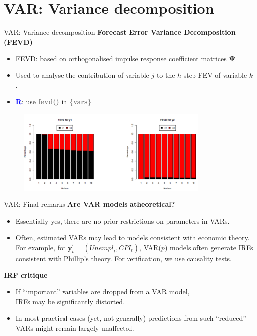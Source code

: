 \documentclass[usenames,dvipsnames]{beamer}
\begin{document}
\section{VAR: Variance decomposition}
\begin{frame}{VAR: Variance decomposition}
\textbf{Forecast Error Variance Decomposition (FEVD)}\\
\medskip
\begin{itemize}
\item FEVD: based on orthogonalised impulse response coefficient matrices $\bm{\Psi}$
\item Used to analyse the contribution of variable $j$ to the $h$-step FEV of variable $k$.
\item \textcolor{Blue}{\textbf{R}}: use \textbf{\textcolor{Gray}{fevd()}} in \textbf{\textcolor{Gray}{\{vars\}}}
\end{itemize}
\vspace*{-6mm}
\begin{figure}
\includegraphics[width=\textwidth, height=4.1cm]{./img/P10_Obrazek_6}
\end{figure}
\end{frame}
\begin{frame}{VAR: Final remarks}
\textbf{Are VAR models atheoretical?}\\
\begin{itemize}
\item Essentially yes, there are no prior restrictions on parameters in VARs.
\item Often, estimated VARs may lead to models consistent with economic theory. For example, for $\bm{y}_t^{\prime} = (\textit{Unempl}_t, \textit{CPI}_t)$, VAR($p$) models often generate IRFs consistent with Phillip’s theory. For verification, we use causality tests.\\
\end{itemize}
\medskip
\textbf{IRF critique}\\
\begin{itemize}
\item If ``important'' variables are dropped from a VAR model,\\IRFs may be significantly distorted.
\item In most practical cases (yet, not generally) predictions from such ``reduced'' VARs might remain largely unaffected.
\end{itemize}
\end{frame}
\end{document}
